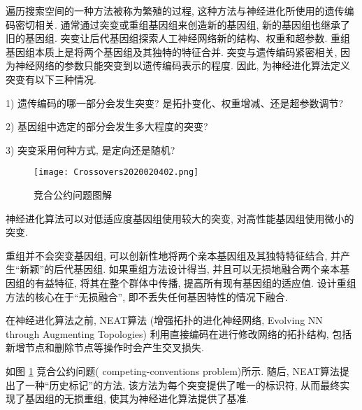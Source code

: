 \begin{remark}
    遍历搜索空间的一种方法被称为繁殖的过程, 这种方法与神经进化所使用的遗传编码密切相关.
    通常通过突变或重组基因组来创造新的基因组, 新的基因组也继承了旧的基因组.
    突变让后代基因组探索人工神经网络新的结构、权重和超参数. 重组基因组本质上是将两个基因组及其独特的特征合并.
突变与遗传编码紧密相关, 因为神经网络的参数只能突变到以遗传编码表示的程度. 因此, 为神经进化算法定义突变有以下三种情况.

1) 遗传编码的哪一部分会发生突变? 是拓扑变化、权重增减、还是超参数调节?

2) 基因组中选定的部分会发生多大程度的突变?

3) 突变采用何种方式, 是定向还是随机?
\begin{figure}[H]
    \centering
    \texttt{[image: Crossovers2020020402.png]}
    \caption{竞合公约问题图解}
    \label{Crossovers2020020402}
\end{figure}
\begin{example}
    神经进化算法可以对低适应度基因组使用较大的突变, 对高性能基因组使用微小的突变.
\end{example}
重组并不会突变基因组, 可以创新性地将两个亲本基因组及其独特特征结合, 并产生“新颖”的后代基因组.
如果重组方法设计得当, 并且可以无损地融合两个亲本基因组的有益特征, 将其在整个群体中传播, 提高所有现有基因组的适应值.
设计重组方法的核心在于“无损融合”, 即不丢失任何基因特性的情况下融合.
\begin{example}
    在神经进化算法之前, NEAT算法 (增强拓扑的进化神经网络, Evolving NN through Augmenting Topologies) 利用直接编码在进行修改网络的拓扑结构, 包括新增节点和删除节点等操作时会产生交叉损失.
\end{example}

如图 \ref{Crossovers2020020402} 竞合公约问题( competing-conventions problem)所示.
随后, NEAT算法提出了一种“历史标记”的方法, 该方法为每个突变提供了唯一的标识符, 从而最终实现了基因组的无损重组, 使其为神经进化算法提供了基准.
\end{remark}

